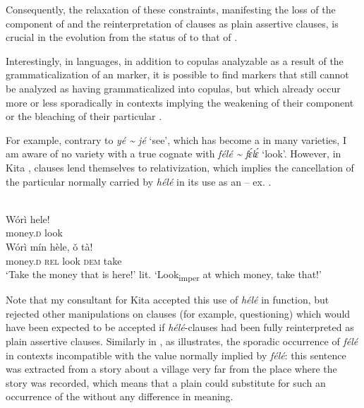 \documentclass[output=paper]{langsci/langscibook}
\begin{document}
Consequently, the relaxation of these constraints, manifesting the loss of the  component of   and the reinterpretation of  clauses as plain assertive clauses, is crucial in the evolution from the status of   to that of .
  
  Interestingly, in  languages, in addition to copulas analyzable as a result of the grammaticalization of an  marker, it is possible to find  markers that still cannot be analyzed as having grammaticalized into copulas, but which already occur more or less sporadically in contexts implying the weakening of their  component or the bleaching of their particular .
  
  For example, contrary to \textit{yé {\textasciitilde} jé} ‘see’, which has become a  in many  varieties, I am aware of no  variety with a true  cognate with \textit{félé {\textasciitilde} f\'{ɛ}l\'{ɛ}} ‘look’. However, in Kita ,  clauses lend themselves to relativization, which implies the cancellation of the particular  normally carried by \textit{hélé} in its use as an   – ex. .

  \ea%
    \label{ex:creissels:12}    
   \\
   \ea
    \gll   Wórì  hele!\\
       money.\textsc{d}  look\\
 \ex
    \gll   Wórì  mín  hèle,  ǒ  tà!\\
       money.\textsc{d}  \textsc{rel}  look  \textsc{dem}  take\\
      \glt ‘Take the money that is here!’
lit. ‘Look\textsubscript{imper} at which money, take that!’ 
\z
\z


Note that my consultant for Kita  accepted this use of \textit{hélé} in   function, but rejected other manipulations on  clauses (for example, questioning) which would have been expected to be accepted if  \textit{hélé}{}-clauses had been fully reinterpreted as plain assertive clauses.
  Similarly in , as  illustrates, the sporadic occurrence of \textit{félé} in contexts incompatible with the  value normally implied by \textit{félé}: this sentence was extracted from a story about a village very far from the place where the story was recorded, which means that a plain   could substitute for such an occurrence of the   without any difference in meaning.
\end{document}
